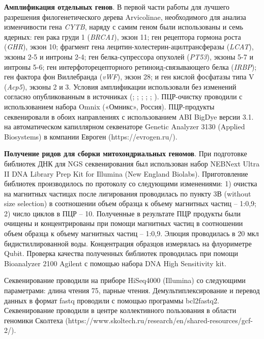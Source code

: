 \textbf{Амплификация отдельных генов}. В первой части работы для лучшего разрешения филогенетического дерева Arvicolinae, необходимого для анализа изменчивости гена \textit{CYTB}, наряду с самим геном были использованы и семь ядерных: ген рака груди 1 (\textit{BRCA1}), экзон 11; ген рецептора гормона роста (\textit{GHR}), экзон 10; фрагмент гена лецитин-холестерин-ацилтрансферазы (\textit{LCAT}), экзоны 2-5 и интроны 2-4; ген белка-супрессора опухолей (\textit{PT53}), экзоны 5-7 и интроны 5-6; ген интерфоторецепторного ретиноид-связывающего белка (\textit{IRBP}); ген фактора фон Виллебранда (\textit{vWF}), экзон 28; и ген кислой фосфатазы типа V (\textit{Acp5}), экзоны 2 и 3. Условия амплификации использовали без изменений согласно опубликованным в источниках (\cite{Lebedev2007}; \cite{Ohdachi2001}; \cite{Bannikova2013}; \cite{Abramson2009}; \cite{Petrova2016}; \cite{Poux2006}). ПЦР-очистку проводили с использованием набора Omnix («Омникс», Россия). ПЦР-продукты секвенировали в обоих направлениях с использованием ABI BigDye версии 3.1. на автоматическом капиллярном секвенаторе Genetic Analyzer 3130 (Applied Biosystems) в компании Евроген (https://evrogen.ru/). 

\textbf{Получение ридов для сборки митохондриальных геномов}. При подготовке библиотек ДНК для NGS секвенирования был использован набор NEBNext Ultra II DNA Library Prep Kit for Illumina (New England Biolabs). Приготовление библиотек производилось по протоколу со следующими изменениями: 1)  очистка на магнитных частицах после лигирования проводилась по пункту 3В (without size selection) в соотношении объем образца к объему магнитных частиц -- 1:0,9; 2) число циклов в ПЦР -- 10.
Полученные в результате ПЦР продукты были очищены и концентрированы при помощи магнитных частиц в соотношении объем образца к объему магнитных частиц -- 1:0,9. Элюция проводилась в 20 мкл бидистиллированной воды. Концентрация образцов измерялась на флуориметре Qubit.
Проверка качества полученных библиотек проводилась при помощи Bioanalyzer 2100 Agilent с помощью набора DNA High Sensitivity kit.

Секвенирование проводили на приборе HiSeq4000 (Illumina) со следующими параметрами: длина чтения 75, парные чтения. Демультиплексирование и перевод данных в формат fastq проводили с помощью программы bcl2fastq2. Секвенирование проводили в центре коллективного пользования в области геномики Сколтеха (https://www.skoltech.ru/research/en/shared-resources/gcf-2/).

